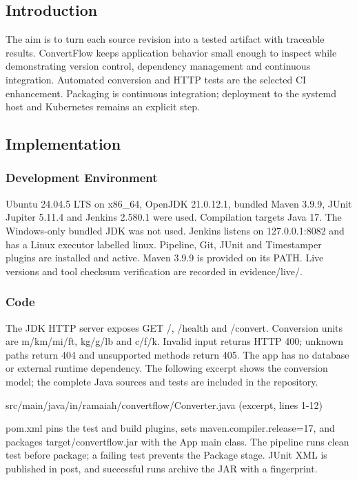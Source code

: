 \documentclass[12pt,a4paper]{article}
\begin{document}
\subsection*{Introduction}
The aim is to turn each source revision into a tested artifact with traceable results. ConvertFlow keeps application behavior small enough to inspect while demonstrating version control, dependency management and continuous integration. Automated conversion and HTTP tests are the selected CI enhancement. Packaging is continuous integration; deployment to the systemd host and Kubernetes remains an explicit step.

\subsection*{Implementation}
\subsubsection*{Development Environment}
Ubuntu 24.04.5 LTS on x86\_64, OpenJDK 21.0.12.1, bundled Maven 3.9.9, JUnit Jupiter 5.11.4 and Jenkins 2.580.1 were used. Compilation targets Java 17. The Windows-only bundled JDK was not used. Jenkins listens on 127.0.0.1:8082 and has a Linux executor labelled linux. Pipeline, Git, JUnit and Timestamper plugins are installed and active. Maven 3.9.9 is provided on its PATH. Live versions and tool checksum verification are recorded in evidence/live/.

\subsubsection*{Code}
The JDK HTTP server exposes GET /, /health and /convert. Conversion units are m/km/mi/ft, kg/g/lb and c/f/k. Invalid input returns HTTP 400; unknown paths return 404 and unsupported methods return 405. The app has no database or external runtime dependency. The following excerpt shows the conversion model; the complete Java sources and tests are included in the repository.

src/main/java/in/ramaiah/convertflow/Converter.java (excerpt, lines 1-12)


pom.xml pins the test and build plugins, sets maven.compiler.release=17, and packages target/convertflow.jar with the App main class. The pipeline runs clean test before package; a failing test prevents the Package stage. JUnit XML is published in post, and successful runs archive the JAR with a fingerprint.
\end{document}
